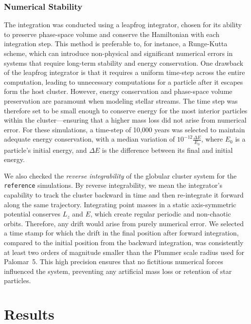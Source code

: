 \documentclass[draft]{aa}
\begin{document}
  \subsubsection*{Numerical Stability}

    The integration was conducted using a leapfrog integrator, chosen for its ability to preserve phase-space volume and conserve the Hamiltonian with each integration step. This method is preferable to, for instance, a Runge-Kutta scheme, which can introduce non-physical and significant numerical errors in systems that require long-term stability and energy conservation. One drawback of the leapfrog integrator is that it requires a uniform time-step across the entire computation, leading to unnecessary computations for a particle after it escapes form the host cluster. However, energy conservation and phase-space volume preservation are paramount when modeling stellar streams. The time step was therefore set to be small enough to conserve energy for the most interior particles within the cluster---ensuring that a higher mass loss did not arise from numerical error. For these simulations, a time-step of 10,000 years was selected to maintain adequate energy conservation, with a median variation of $10^{-12} \frac{\Delta E}{E_0}$, where $E_0$ is a particle's initial energy, and $\Delta E$ is the difference between its final and initial energy. 
    
    We also checked the \textit{reverse integrability} of the globular cluster system for the \texttt{reference} simulations. By reverse integrability, we mean the integrator's capability to track the cluster backward in time and then re-integrate it forward along the same trajectory. Integrating point masses in a static axis-symmetric potential conserves $L_z$ and $E$, which create regular periodic and non-chaotic orbits. Therefore, any drift would arise from purely numerical error. We selected a time stamp for which the drift in the final position after forward integration, compared to the initial position from the backward integration, was consistently at least two orders of magnitude smaller than the Plummer scale radius used for Palomar~5. This high precision ensures that no fictitious numerical forces influenced the system, preventing any artificial mass loss or retention of star particles.

\section{Results}
\end{document}
